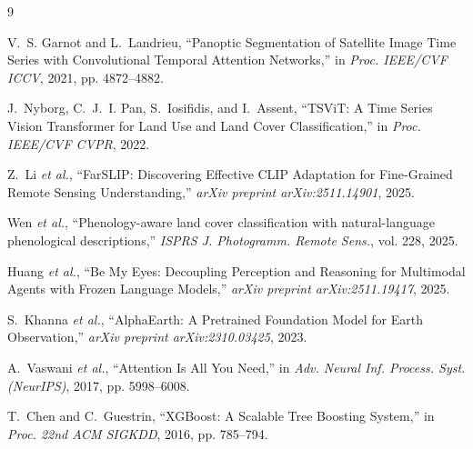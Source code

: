 \documentclass{article}
\begin{document}
\begin{thebibliography}{9}

V.~S. Garnot and L.~Landrieu,
``Panoptic Segmentation of Satellite Image Time Series with Convolutional
Temporal Attention Networks,''
in \textit{Proc. IEEE/CVF ICCV}, 2021, pp. 4872--4882.

J.~Nyborg, C.~J.~I. Pan, S.~Iosifidis, and I.~Assent,
``TSViT: A Time Series Vision Transformer for Land Use and Land Cover
Classification,''
in \textit{Proc. IEEE/CVF CVPR}, 2022.

Z.~Li \textit{et al.},
``FarSLIP: Discovering Effective CLIP Adaptation for Fine-Grained Remote
Sensing Understanding,''
\textit{arXiv preprint arXiv:2511.14901}, 2025.

Wen \textit{et al.},
``Phenology-aware land cover classification with natural-language
phenological descriptions,''
\textit{ISPRS J. Photogramm. Remote Sens.}, vol. 228, 2025.

Huang \textit{et al.},
``Be My Eyes: Decoupling Perception and Reasoning for Multimodal Agents with
Frozen Language Models,''
\textit{arXiv preprint arXiv:2511.19417}, 2025.

S.~Khanna \textit{et al.},
``AlphaEarth: A Pretrained Foundation Model for Earth Observation,''
\textit{arXiv preprint arXiv:2310.03425}, 2023.

A.~Vaswani \textit{et al.},
``Attention Is All You Need,''
in \textit{Adv. Neural Inf. Process. Syst. (NeurIPS)}, 2017,
pp. 5998--6008.

T.~Chen and C.~Guestrin,
``XGBoost: A Scalable Tree Boosting System,''
in \textit{Proc. 22nd ACM SIGKDD}, 2016, pp. 785--794.

\end{thebibliography}
\end{document}
